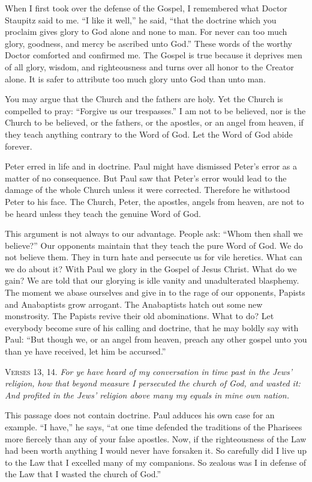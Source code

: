 When I first took over the defense of the Gospel, I remembered what Doctor Staupitz said to me. “I like it well,” he said, “that the doctrine which you proclaim gives glory to God alone and none to man. For never can too much glory, goodness, and mercy be ascribed unto God.” These words of the worthy Doctor comforted and confirmed me. The Gospel is true because it deprives men of all glory, wisdom, and righteousness and turns over all honor to the Creator alone. It is safer to attribute too much glory unto God than unto man.

You may argue that the Church and the fathers are holy. Yet the Church is compelled to pray: “Forgive us our trespasses.” I am not to be believed, nor is the Church to be believed, or the fathers, or the apostles, or an angel from heaven, if they teach anything contrary to the Word of God. Let the Word of God abide forever.

Peter erred in life and in doctrine. Paul might have dismissed Peter’s error as a matter of no consequence. But Paul saw that Peter’s error would lead to the damage of the whole Church unless it were corrected. Therefore he withstood Peter to his face. The Church, Peter, the apostles, angels from heaven, are not to be heard unless they teach the genuine Word of God.

This argument is not always to our advantage. People ask: “Whom then shall we believe?” Our opponents maintain that they teach the pure Word of God. We do not believe them. They in turn hate and persecute us for vile heretics. What can we do about it? With Paul we glory in the Gospel of Jesus Christ. What do we gain? We are told that our glorying is idle vanity and unadulterated blasphemy. The moment we abase ourselves and give in to the rage of our opponents, Papists and Anabaptists grow arrogant. The Anabaptists hatch out some new monstrosity. The Papists revive their old abominations. What to do? Let everybody become sure of his calling and doctrine, that he may boldly say with Paul: “But though we, or an angel from heaven, preach any other gospel unto you than ye have received, let him be accursed.”

\textsc{Verses} 13, 14. \emph{For ye have heard of my conversation in time past in the Jews’ religion, how that beyond measure I persecuted the church of God, and wasted it: And profited in the Jews’ religion above many my equals in mine own nation.}

This passage does not contain doctrine. Paul adduces his own case for an example. “I have,” he says, “at one time defended the traditions of the Pharisees more fiercely than any of your false apostles. Now, if the righteousness of the Law had been worth anything I would never have forsaken it. So carefully did I live up to the Law that I excelled many of my companions. So zealous was I in defense of the Law that I wasted the church of God.”

